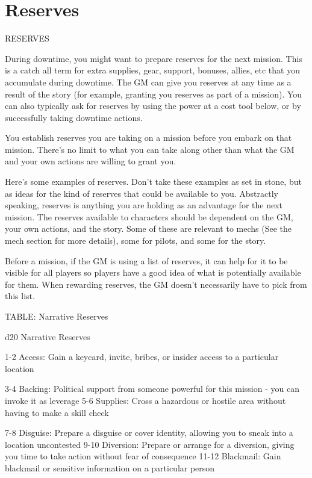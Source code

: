 \section{Reserves}
                                                 RESERVES

During downtime, you might want to prepare reserves for the next mission. This is a catch all
term for extra supplies, gear, support, bonuses, allies, etc that you accumulate during downtime.
The GM can give you reserves at any time as a result of the story (for example, granting you
reserves as part of a mission). You can also typically ask for reserves by using the power at a
cost tool below, or by successfully taking downtime actions.


You establish reserves you are taking on a mission before you embark on that mission. There’s
no limit to what you can take along other than what the GM and your own actions are willing to
grant you.


Here’s some examples of reserves. Don’t take these examples as set in stone, but as ideas for
the kind of reserves that could be available to you. Abstractly speaking, reserves is anything
you are holding as an advantage for the next mission. The reserves available to characters
should be dependent on the GM, your own actions, and the story. Some of these are relevant to
mechs (See the mech section for more details), some for pilots, and some for the story.


Before a mission, if the GM is using a list of reserves, it can help for it to be visible for all
players so players have a good idea of what is potentially available for them. When rewarding
reserves, the GM doesn’t necessarily have to pick from this list.


TABLE: Narrative Reserves




 d20       Narrative	Reserves

  1-2      Access: Gain a keycard, invite, bribes, or insider access to a particular location

  3-4      Backing: Political support from someone powerful for this mission - you can invoke it
           as leverage
  5-6      Supplies: Cross a hazardous or hostile area without having to make a skill check

  7-8      Disguise: Prepare a disguise or cover identity, allowing you to sneak into a location
           uncontested
 9-10      Diversion: Prepare or arrange for a diversion, giving you time to take action without
           fear of consequence
   11-12   Blackmail: Gain blackmail or sensitive information on a particular person

